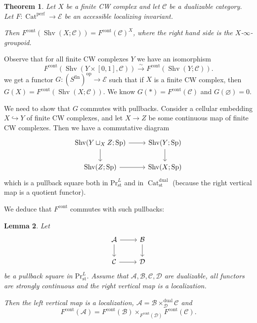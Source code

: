 \documentclass[draft]{amsart}
\newcommand{\cat}[1]{\mathcal{#1}}
\renewcommand{\emptyset}{\varnothing}
\newcommand{\op}{\mathrm{op}}
\newcommand{\isoto}{\mathbin{\xrightarrow{\sim}}}
\newcommand{\injto}{\mathbin{\hookrightarrow}}
\renewcommand{\Pr}{\mathrm{Pr}}
\DeclareMathOperator{\Shv}{Shv}
\DeclareMathOperator{\Cat}{Cat}
\DeclareMathOperator{\Sp}{Sp}
\newtheorem{thm}{Theorem}[section]
\newtheorem{lem}[thm]{Lemma}
\theoremstyle{definition}
\begin{document}
\begin{thm}
Let $X$ be a finite CW complex and let $\cat C$ be a dualizable category. Let $F\colon \Cat^{\mathrm{perf}} \to \cat E$ be an accessible localizing invariant.

Then $F^{\mathrm{cont}}(\Shv(X;\cat C)) = F^{\mathrm{cont}}(\cat C)^X$, where the right hand side is the $X$-$\infty$-groupoid.
\end{thm}

Observe that for all finite CW complexes $Y$ we have an isomorphism
\[
F^{\mathrm{cont}}(\Shv(Y\times [0,1], \cat C)) \isoto F^{\mathrm{cont}}(\Shv(Y; \cat C)).
\]
we get a functor $G\colon (S^{\mathrm{fin}})^\op \to \cat E$ such that if $X$ is a finite CW complex, then $G(X) = F^{\mathrm{cont}}(\Shv(X;\cat C))$. We know $G(*) = F^{\mathrm{cont}}(\cat C)$ and $G(\emptyset) = 0$.

We need to show that $G$ commutes with pullbacks. Consider a cellular embedding $X\injto Y$ of finite CW complexes, and let $X\to Z$ be some continuous map of finite CW complexes. Then we have a commutative diagram
\[
\begin{tikzcd}
\Shv(Y\sqcup_XZ; \Sp) \ar[r]\ar[d] & \Shv(Y;\Sp) \ar[d] \\
\Shv(Z; \Sp) \ar[r] & \Shv(X;\Sp)
\end{tikzcd}
\]
which is a pullback square both in $\Pr^L_{\mathrm{st}}$ and in $\Cat^{\mathrm{dual}}_{\mathrm{st}}$ (because the right vertical map is a quotient functor).

We deduce that $F^{\mathrm{cont}}$ commutes with such pullbacks:

\begin{lem}
Let
\[
\begin{tikzcd}
\cat A \ar[d] \ar[r] & \cat B \ar[d] \\
\cat C \ar[r] & \cat D
\end{tikzcd}
\]
be a pullback square in $\Pr^L_{\mathrm{st}}$. Assume that $\cat A, \cat B, \cat C, \cat D$ are dualizable, all functors are strongly continuous and the right vertical map is a localization. 

Then the left vertical map is a localization, $\cat A = \cat B\times_{\cat D}^{\mathrm{dual}} \cat C$ and
\[
F^{\mathrm{cont}}(\cat A) = F^{\mathrm{cont}}(\cat B)\times_{F^{\mathrm{cont}}(\cat D)} F^{\mathrm{cont}}(\cat C).
\]
\end{lem}
\end{document}

